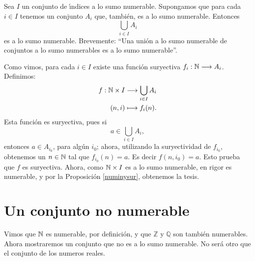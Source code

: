 \begin{proposicion}\label{unionnumdenum} Sea $I$ un conjunto de \'{\i}ndices a lo sumo
numerable. Supongamos que para cada $i\in I$ tenemos un conjunto
$A_i$ que, tambi\'en, es a lo sumo numerable. Entonces
\[\bigcup_{i\in I}A_i\]
es a lo sumo numerable. Brevemente: ``Una uni\'on a lo sumo
numerable de conjuntos a lo sumo numerables es a lo sumo
numerable''.
\end{proposicion}

\begin{demo} Como vimos, para cada $i\in I$ existe una funci\'on
suryectiva $f_i:\nn\longrightarrow A_i$. Definimos:
\[\begin{split}
      f:\nn\times I &\longrightarrow \bigcup_{i\in I}A_i\\
         (n,i)&\longmapsto f_i(n).\\
 \end{split}
\]
Esta funci\'on es suryectiva, pues si
\[a\in\bigcup_{i\in I}A_i,\]
entonces $a\in A_{i_0}$, para alg\'un $i_0$; ahora, utilizando la
suryectividad de $f_{i_0}$, obtenemos un $n\in\nn$ tal que
$f_{i_0}(n)=a$. Es decir $f(n,i_0)=a$. Esto prueba que $f$  es
suryectiva. Ahora, como $\nn\times I$ es a lo sumo numerable, en
rigor es numerable, y por la Proposici\'on \vref{numinysur},
obtenemos la tesis.
\end{demo}


\section{Un conjunto no numerable}
Vimos que $\nn$ es numerable, por definici\'on, y que $\mathbb{Z}$
y $\mathbb{Q}$ son tambi\'en numerables. Ahora mostraremos un
conjunto que no es a lo sumo numerable. No ser\'a otro que el
conjunto de los numeros reales.


